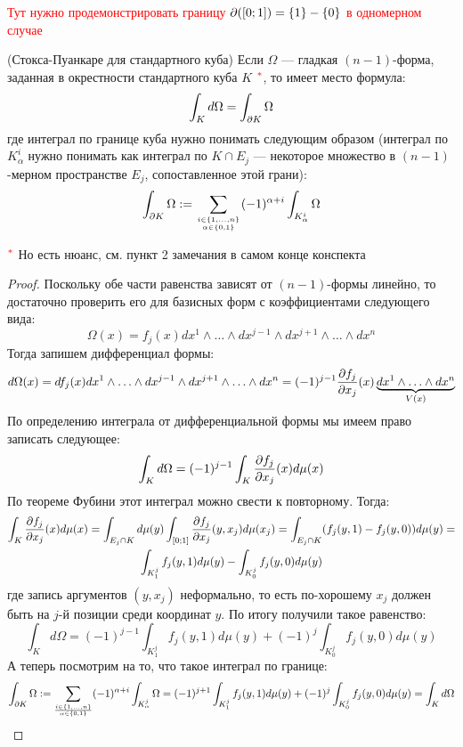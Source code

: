 \textcolor{red}{Тут нужно продемонстрировать границу $\partial([0; 1]) = \{1\} - \{0\}$ в одномерном случае}

\begin{theorem} (Стокса-Пуанкаре для стандартного куба)
	Если $\Omega$ --- гладкая $(n - 1)$-форма, заданная в окрестности стандартного куба $K$ $\textcolor{red}{^*}$, то имеет место формула:
	\[
		\int_K d\Omega = \int_{\partial K} \Omega
	\]
	где интеграл по границе куба нужно понимать следующим образом (интеграл по $K_\alpha^i$ нужно понимать как интеграл по $K \cap E_j$ --- некоторое множество в $(n - 1)$-мерном пространстве $E_j$, сопоставленное этой грани):
	\[
		\int_{\partial K} \Omega := \sum_{i \in \{1, \ldots, n\} \atop {\alpha \in \{0, 1\}}} (-1)^{\alpha + i} \int_{K_\alpha^i} \Omega
	\]
\end{theorem}

$\textcolor{red}{^*}$ Но есть нюанс, см. пункт 2 замечания в самом конце конспекта

\begin{proof}
	Поскольку обе части равенства зависят от $(n - 1)$-формы линейно, то достаточно проверить его для базисных форм с коэффициентами следующего вида:
	\[
		\Omega(x) = f_j(x) dx^1 \wedge \ldots \wedge dx^{j - 1} \wedge dx^{j + 1} \wedge \ldots \wedge dx^n
	\]
	Тогда запишем дифференциал формы:
	\[
		d\Omega(x) = df_j(x)dx^1 \wedge \ldots \wedge dx^{j - 1} \wedge dx^{j + 1} \wedge \ldots \wedge dx^n = (-1)^{j - 1}\frac{\partial f_j}{\partial x_j}(x) \underbrace{dx^1 \wedge \ldots \wedge dx^n}_{V(x)}
	\]
	По определению интеграла от дифференциальной формы мы имеем право записать следующее:
	\[
		\int_K d\Omega = (-1)^{j - 1}\int_K \frac{\partial f_j}{\partial x_j}(x)d\mu(x)
	\]
	По теореме Фубини этот интеграл можно свести к повторному. Тогда:
	\begin{multline*}
		\int_K \frac{\partial f_j}{\partial x_j}(x)d\mu(x) = \int_{E_j \cap K} d\mu(y) \int_{[0; 1]} \frac{\partial f_j}{\partial x_j} (y, x_j) d\mu(x_j) = \int_{E_j \cap K} (f_j(y, 1) - f_j(y, 0))d\mu(y) =
		\\
		\int_{K_1^j} f_j(y, 1)d\mu(y) - \int_{K_0^j} f_j(y, 0)d\mu(y)
	\end{multline*}
	где запись аргументов $(y, x_j)$ неформально, то есть по-хорошему $x_j$ должен быть на $j$-й позиции среди координат $y$. По итогу получили такое равенство:
	\[
		\int_K d\Omega = (-1)^{j - 1}\int_{K_1^j} f_j(y, 1)d\mu(y) + (-1)^j \int_{K_0^j} f_j(y, 0)d\mu(y)
	\]
	А теперь посмотрим на то, что такое интеграл по границе:
	\[
		\int_{\partial K} \Omega := \sum_{i \in \{1, \ldots, n\} \over {\alpha \in \{0, 1\}}} (-1)^{\alpha + i} \int_{K_\alpha^j} \Omega = (-1)^{j + 1} \int_{K_1^j} f_j(y, 1)d\mu(y) + (-1)^j \int_{K_0^j} f_j(y, 0)d\mu(y) = \int_K d\Omega
	\]
\end{proof}

